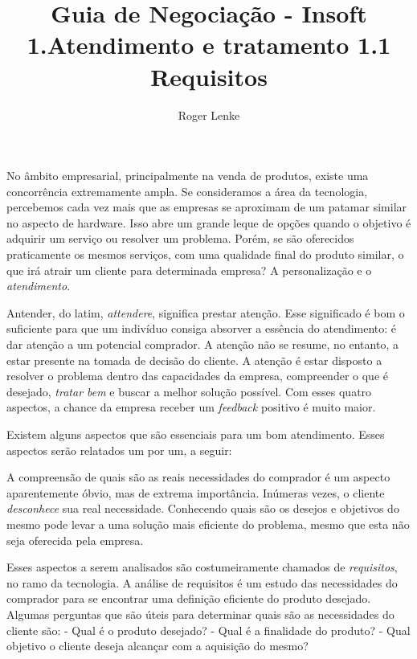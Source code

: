 \documentclass[12pt]{article}
\begin{document}
\title{%
  Guia de Negociação - Insoft \\\hfill \break
  \large 1.Atendimento e tratamento}

\author{Roger Lenke}
\maketitle


No âmbito empresarial, principalmente na venda de produtos, existe uma concorrência extremamente ampla. Se consideramos a área da tecnologia, percebemos cada vez
mais que as empresas se aproximam de um patamar similar no aspecto de hardware. Isso abre um grande leque de opções quando o objetivo é adquirir um serviço ou resolver um problema.
Porém, se são oferecidos praticamente os mesmos serviços, com uma qualidade final do produto similar, o que irá atrair um cliente para determinada empresa? A personalização e o 
\emph {atendimento}.
\hfill \break

Antender, do latim, \emph{attendere}, significa prestar atenção. Esse significado é bom o suficiente para que um indivíduo consiga absorver a essência do atendimento: é dar atenção a um potencial comprador. A atenção não se resume, no entanto, a estar presente na tomada de decisão do cliente. A atenção é estar disposto a resolver o problema dentro das capacidades da empresa, compreender o que é desejado, \emph{tratar bem} e buscar a melhor solução possível. Com esses quatro aspectos, a chance da empresa receber um \emph{feedback} positivo é muito maior.
\hfill \break

Existem alguns aspectos que são essenciais para um bom atendimento. Esses aspectos serão relatados um por um, a seguir:
\hfill \break

\title{%
\large 1.1 Requisitos}
\hfill \break

A compreensão de quais são as reais necessidades do comprador é um aspecto aparentemente óbvio, mas de extrema importância. Inúmeras vezes, o cliente \emph{desconhece} sua real necessidade. Conhecendo quais são os desejos e objetivos do mesmo pode levar a uma solução mais eficiente do problema, mesmo que esta não seja oferecida pela empresa.
\hfill \break

Esses aspectos a serem analisados são costumeiramente chamados de \emph{requisitos}, no ramo da tecnologia. A análise de requisitos é um estudo das necessidades do comprador para se encontrar uma definição eficiente do produto desejado. Algumas perguntas que são úteis para determinar quais são as necessidades do cliente são: \hfill \break
- Qual é o produto desejado? \hfill \break
- Qual é a finalidade do produto? \hfill \break
- Qual objetivo o cliente deseja alcançar com a aquisição do mesmo?
\hfill \break
\end{document}

